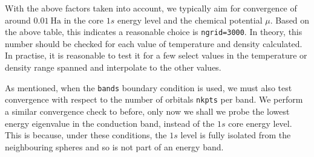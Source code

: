 \documentclass[9pt]{article}
\begin{document}
With the above factors taken into account, we typically aim for
convergence of around \(0.01\ \textrm{Ha}\) in the core \(1s\) energy
level and the chemical potential \(\mu\). Based on the above table, this
indicates a reasonable choice is \texttt{ngrid=3000}. In theory, this
number should be checked for each value of temperature and density
calculated. In practise, it is reasonable to test it for a few select
values in the temperature or density range spanned and interpolate to
the other values.

As mentioned, when the \texttt{bands} boundary condition is used, we
must also test convergence with respect to the number of orbitals
\texttt{nkpts} per band. We perform a similar convergence check to
before, only now we shall we probe the lowest energy eigenvalue in the
conduction band, instead of the \(1s\) core energy level. This is
because, under these conditions, the \(1s\) level is fully isolated from
the neighbouring spheres and so is not part of an energy band.
\end{document}
